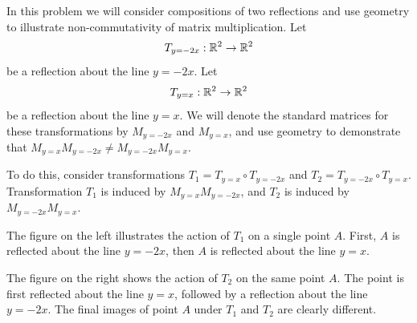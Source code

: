 \documentclass{ximera}
\begin{document}
\begin{exploration}\label{init:reflectioncomp}  In this problem we will consider compositions of two reflections and use geometry to illustrate non-commutativity of matrix multiplication.  
Let $$T_{y=-2x}:\RR^2\rightarrow \RR^2$$ be a reflection about the line $y=-2x$.  Let $$T_{y=x}:\RR^2\rightarrow \RR^2$$ be a reflection about the line $y=x$. We will denote the standard matrices for these transformations by $M_{y=-2x}$ and $M_{y=x}$, and
 use geometry to demonstrate that $M_{y=x}M_{y=-2x}\neq M_{y=-2x}M_{y=x}$.  
 
 To do this, consider transformations $T_1=T_{y=x}\circ T_{y=-2x}$ and $T_2=T_{y=-2x}\circ T_{y=x}$.  Transformation $T_1$ is induced by $M_{y=x}M_{y=-2x}$, and $T_2$ is induced by $M_{y=-2x}M_{y=x}$.

The figure on the left illustrates the action of $T_1$ on a single point $A$.  First, $A$ is reflected about the line $y=-2x$, then $A$ is reflected about the line $y=x$.   

The figure on the right shows the action of $T_2$ on the same point $A$.  The point is first reflected about the line $y=x$, followed by a reflection about the line $y=-2x$.  The final images of point $A$ under $T_1$ and $T_2$ are clearly different.

\begin{center}
  \quad\quad
\begin{tikzpicture}[scale=.3]
 

\end{tikzpicture}
\end{center}
\end{exploration}
\end{document}
